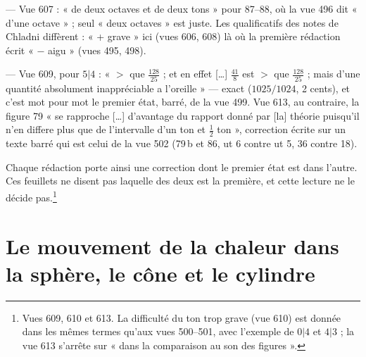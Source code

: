 \documentclass[11pt,a4paper]{article}
\begin{document}
— Vue 607 : « de deux octaves et de deux tons » pour 87--88, où la vue 496 dit
« d'une octave » ; seul « deux octaves » est juste. Les qualificatifs des notes
de Chladni diffèrent : « + grave » ici (vues 606, 608) là où la première
rédaction écrit « $-$ aigu » (vues 495, 498).

— Vue 609, pour $5|4$ : « $>$ que $\frac{128}{25}$ ; et en effet […]
$\frac{41}{8}$ est $>$ que $\frac{128}{25}$ ; mais d'une quantité absolument
inappréciable a l'oreille » — exact ($1025/1024$, 2 cents), et c'est mot pour
mot le premier état, barré, de la vue 499. Vue 613, au contraire, la figure 79
« se rapproche […] d'avantage du rapport donné par [la] théorie puisqu'il n'en
differe plus que de l'intervalle d'un ton et $\frac12$ ton », correction écrite
sur un texte barré qui est celui de la vue 502 (79\,b et 86, ut 6 contre ut 5,
36 contre 18).

Chaque rédaction porte ainsi une correction dont le premier état est dans
l'autre. Ces feuillets ne disent pas laquelle des deux est la première, et cette
lecture ne le décide pas.\footnote{Vues 609, 610 et 613. La difficulté du ton
trop grave (vue 610) est donnée dans les mêmes termes qu'aux vues 500--501,
avec l'exemple de $0|4$ et $4|3$ ; la vue 613 s'arrête sur « dans la
comparaison au son des figures ».}

\section*{Le mouvement de la chaleur dans la sphère, le cône et le cylindre}
\end{document}
